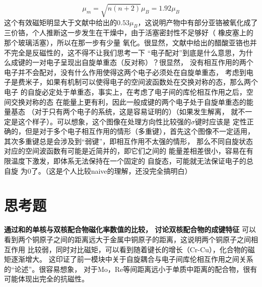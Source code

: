\documentclass[a4paper,zihao=5,UTF8]{ctexart}
\begin{document}
        \begin{equation}
            \mu_{m} = \sqrt{n(n+2)}\mu_B = 1.92\mu_B
        \end{equation}
        这个有效磁矩明显大于文献中给出的$0.53\mu_B$，这说明产物中有部分亚铬被氧化成了
        三价铬，个人推断这一步发生在干燥中，由于活塞密封性不足够好（
        橡皮塞上的那个玻璃活塞），所以在那一步有少量
        氧化。很显然，文献中给出的醋酸亚铬也并不完全是反磁性的，这不得不让我们思考一下
        “电子配对”到底是什么意思，为什么成键的一对电子呈现出自旋单重态（反对称）？很显然，
        没有相互作用的两个电子并不会配对，没有什么作用使得这两个电子必须处在自旋单重态，
        考虑到电子是费米子，如果有机制可以使得电子的空间波函数处在交换对称的态，那么两个电子
        的自旋必定处于单重态，事实上，在考虑了电子间的库伦相互作用之后，空间交换对称的态
        在能量上更有利，因此一般成键的两个电子处于自旋单重态的能量基态
        （对于只有两个电子的系统，这是容易证明的）（如果发生解离，
        就不一定是这个样子）。可以想象，这个图像在处理方向性比较强的$\sigma$键时应该是
        定性正确的，但是对于多个电子相互作用的情形（多重键），首先这个图像不一定适用，
        其次多重键总是会涉及到“弱键”，即相互作用不太强的情形，
        那么不同自旋状态对应的空间波函数有可能是近简并的，即它们之间的
        能量差相差很小，容易在有限温度下激发，即体系无法保持在一个固定的
        自旋态，可能就无法保证电子的总自旋
        为0了。（这是个人比较naive的理解，还没完全搞明白）

    \section{思考题}
    \par \textbf{通过和的单核与双核配合物磁化率数值的比较，
    讨论双核配合物的成键特征}
    可以看到两个铜原子之间的距离远大于金属中铜原子的距离，这说明两个铜原子之间相互作用
    比较弱，同时对比磁矩，可以看到随着键长的增长（Cr-Cu），化合物的磁矩逐渐增大。
    这印证了前一模块中关于自旋耦合与电子间库伦相互作用之间关系的“论述”。很容易想象，
    对于Mo，Re等间距离远小于单质中距离的配合物，很有可能体现出完全的抗磁性。
    
	
\end{document}
